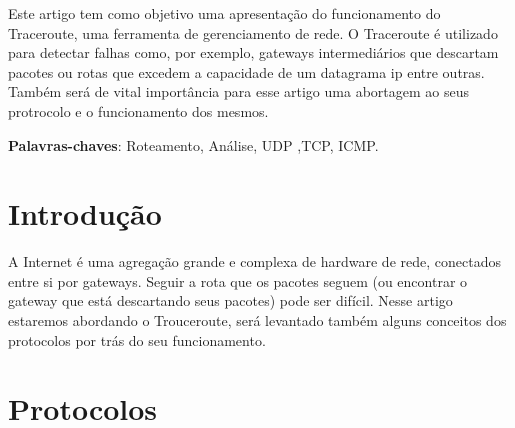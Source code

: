\documentclass[
	article,			%
	11pt,				%
	oneside,			%
	a4paper,			%
	section=TITLE,		%
	english,			%
	brazil,				%
	sumario=tradicional
	]{abntex2}
\begin{document}
\frenchspacing 


%
%
\maketitle

\begin{resumoumacoluna}
 Este artigo tem como objetivo uma apresentação do funcionamento do Traceroute, uma ferramenta de gerenciamento de rede. O Traceroute é utilizado para detectar falhas como, por exemplo, gateways intermediários que descartam pacotes ou rotas que excedem a capacidade de um datagrama ip entre outras. Também será de vital importância para esse artigo uma abortagem ao seus protrocolo e o funcionamento dos mesmos.
 
 \vspace{\onelineskip}
 
 \noindent
 \textbf{Palavras-chaves}: Roteamento, Análise, UDP ,TCP, ICMP.
\end{resumoumacoluna}


\textual

\section*{Introdução}
A Internet é uma agregação grande e complexa de hardware de rede, conectados entre si por gateways. Seguir a rota que os pacotes seguem (ou encontrar o gateway que está descartando seus pacotes) pode ser difícil. 
Nesse artigo estaremos abordando o Trouceroute, será levantado também alguns conceitos dos protocolos por trás do seu funcionamento.

\section{Protocolos}
\end{document}
